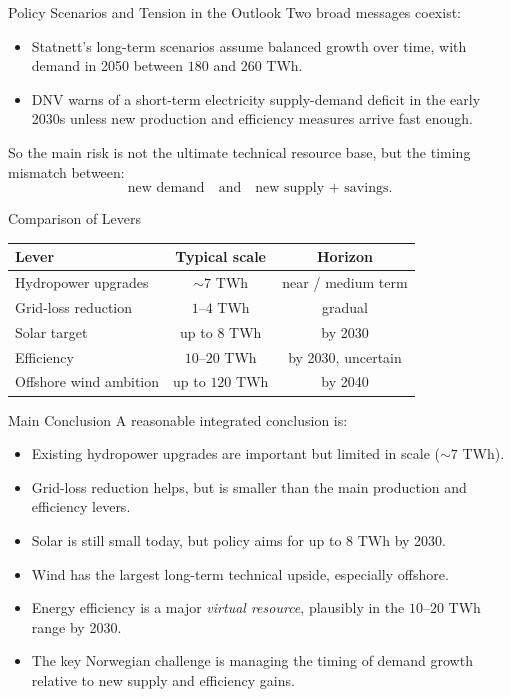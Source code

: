 \documentclass[aspectratio=169]{beamer}
\begin{document}
\begin{frame}{Policy Scenarios and Tension in the Outlook}
Two broad messages coexist:
\begin{itemize}
    \item Statnett's long-term scenarios assume balanced growth over time, with demand in 2050 between \(180\) and \(260\) TWh.
    \item DNV warns of a short-term electricity supply-demand deficit in the early 2030s unless new production and efficiency measures arrive fast enough.
\end{itemize}

\medskip

So the main risk is not the ultimate technical resource base, but the timing mismatch between:
\[
\text{new demand} \quad \text{and} \quad \text{new supply + savings}.
\]
\end{frame}

\begin{frame}{Comparison of Levers}
\begin{center}
\begin{tabular}{lcc}
\toprule
Lever & Typical scale & Horizon \\
\midrule
Hydropower upgrades & \(\sim 7\) TWh & near / medium term \\
Grid-loss reduction & \(1\text{--}4\) TWh & gradual \\
Solar target & up to \(8\) TWh & by 2030 \\
Efficiency & \(10\text{--}20\) TWh & by 2030, uncertain \\
Offshore wind ambition & up to \(120\) TWh & by 2040 \\
\bottomrule
\end{tabular}
\end{center}
\end{frame}

\begin{frame}{Main Conclusion}
A reasonable integrated conclusion is:
\begin{itemize}
    \item Existing hydropower upgrades are important but limited in scale (\(\sim 7\) TWh).
    \item Grid-loss reduction helps, but is smaller than the main production and efficiency levers.
    \item Solar is still small today, but policy aims for up to \(8\) TWh by 2030.
    \item Wind has the largest long-term technical upside, especially offshore.
    \item Energy efficiency is a major \emph{virtual resource}, plausibly in the \(10\text{--}20\) TWh range by 2030.
    \item The key Norwegian challenge is managing the timing of demand growth relative to new supply and efficiency gains.
\end{itemize}
\end{frame}
\end{document}
